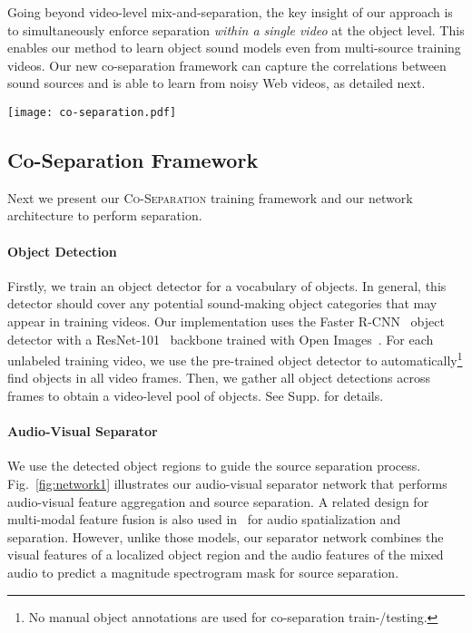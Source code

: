 \documentclass[10pt,twocolumn,letterpaper]{article}
\begin{document}
Going beyond video-level mix-and-separation, the key insight of our approach is to simultaneously enforce separation \emph{within a single video} at the object level. This enables our method to learn object sound models even from multi-source training videos. Our new co-separation framework can capture the correlations between sound sources and is able to learn from noisy Web videos, as detailed next.  

\begin{figure*}[t]
    \center
    \texttt{[image: co-separation.pdf]}
    \caption{Co-separation training pipeline: our object-level co-separation framework first automatically detects objects in a pair of videos, then mixes the audios at the video-level, and separates the sounds for each visual object. The network is trained by minimizing the combination of the co-separation and object-consistency losses defined in Sec.~\ref{sec:network}.}
    \label{fig:network2}
    \vspace*{-0.1in}
\end{figure*}

\subsection{Co-Separation Framework}\label{sec:network}
Next we present our \textsc{Co-Separation} training framework and our network architecture to perform separation.

\vspace*{-0.2in}
\paragraph{Object Detection}
Firstly, we train an object detector for a vocabulary of  objects.  In general, this detector should cover any potential sound-making object categories that may appear in training videos.  Our implementation uses the Faster R-CNN~\cite{ren2015faster} object detector with a ResNet-101~\cite{he2016deep} backbone trained with Open Images~\cite{OpenImages2}.  For each unlabeled training video, we use the pre-trained object detector to automatically\footnote{No manual object annotations are used for co-separation train-/testing.} find objects in all video frames. Then, we gather all object detections across frames to obtain a video-level pool of objects. See Supp. for details.

\vspace*{-0.2in}
\paragraph{Audio-Visual Separator}
We use the detected object regions to guide the source separation process. Fig.~\ref{fig:network1} illustrates our audio-visual separator network that performs audio-visual feature aggregation and source separation. A related design for multi-modal feature fusion is also used in~\cite{gao2019visualsound,morgadoNIPS18,owens2018audio} for audio spatialization and separation. However, unlike those models, our separator network combines the visual features of a localized object region and the audio features of the mixed audio to predict a magnitude spectrogram mask for source separation.
\end{document}
